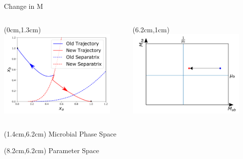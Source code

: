 \documentclass[15pt]{beamer}
\begin{document}
\begin{frame}{Change in M}
\begin{columns}
\begin{textblock*}{7cm}(0cm,1.3cm) %
	 \includegraphics[width=0.9\textwidth]{changed_traj_sep}
	\end{textblock*}
	\begin{textblock*}{7.3cm}(6.2cm,1cm) %
	 \includegraphics[width=0.9\textwidth]{delta_M_PARA}
	\end{textblock*}
\end{columns}
\begin{textblock*}{6cm}(1.4cm,6.2cm) %
Microbial Phase Space
\end{textblock*}
\begin{textblock*}{6cm}(8.2cm,6.2cm) %
Parameter Space
\end{textblock*}
\end{frame}
\end{document}
